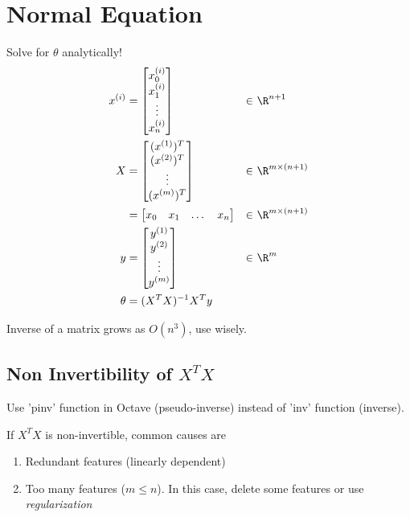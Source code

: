 \section{Normal Equation}
Solve for $\theta$ analytically!
\begin{align*}
    x^{(i)} & = \begin{bmatrix}
        x_0^{(i)} \\
        x_1^{(i)} \\
        \vdots    \\
        x_n^{(i)} \\
    \end{bmatrix} & \in & \ \R^{n+1}            \\
    X       & = \begin{bmatrix}
        (x^{(1)})^T \\
        (x^{(2)})^T \\
        \vdots      \\
        (x^{(m)})^T \\
    \end{bmatrix} & \in & \ \R^{m \times (n+1)} \\
            & = \begin{bmatrix}
        x_0 & x_1 & \dots & x_n \\
    \end{bmatrix} & \in & \ \R^{m \times (n+1)} \\
    y       & = \begin{bmatrix}
        y^{(1)} \\
        y^{(2)} \\
        \vdots  \\
        y^{(m)} \\
    \end{bmatrix} & \in & \ \R^m                \\
    \theta  & = (X^TX)^{-1}X^Ty                                          \\
\end{align*}

Inverse of a matrix grows as $O(n^3)$, use wisely.

\subsection{Non Invertibility of \texorpdfstring{$X^TX$}{}}
Use 'pinv' function in Octave (pseudo-inverse) instead of 'inv' function (inverse).

If $X^TX$ is non-invertible, common causes are
\begin{enumerate}
    \item Redundant features (linearly dependent)
    \item Too many features ($m \le n$). In this case, delete some features or use \emph{regularization}
\end{enumerate}

